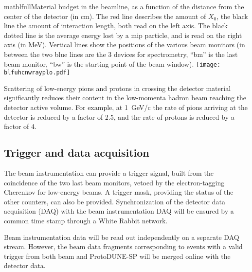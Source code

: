   
 \begin{cdrfigure}{matblfull}{Material budget in the beamline, as a function of the distance from the center of the detector (in cm). The red line describes the amount of $X_0$, the black line the amount of interaction length, both read on the left axis. The black dotted line is the average energy lost by a mip particle, and is read on the right axis (in MeV). Vertical lines show the positions of the various beam monitors (in between the two blue lines are the 3 devices for spectrometry, ``bm'' is the last beam monitor, ``bw'' is the starting point of the beam window).}  
\texttt{[image: blfuhcnwrayplo.pdf]}
\end{cdrfigure}
 
 Scattering of low-energy pions and protons in crossing the detector material significantly reduces their content in the low-momenta hadron beam reaching the detector active volume. For example, at 1~GeV/c the rate of pions arriving at the detector is reduced by a factor of 2.5, and the rate of protons 
 is reduced by a factor of 4. 


\subsection {Trigger and data acquisition}

The beam instrumentation can provide a trigger signal, built from the coincidence of the two last beam monitors, vetoed by the electron-tagging Cherenkov for low-energy beams. 
A trigger mask, providing the status of the other counters, can also be provided. 
 Synchronization of the detector data acquisition (DAQ) with the beam instrumentation DAQ will be ensured by a common time stamp through a White Rabbit network.

Beam instrumentation data will be read out independently on a separate DAQ stream. However,  
the beam data fragments corresponding to  events with a valid trigger from both beam and ProtoDUNE-SP will be merged online with the detector data.
 
